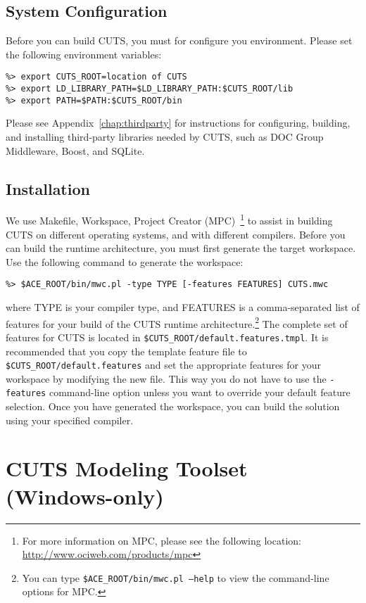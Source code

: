\subsection{System Configuration}

Before you can build CUTS, you must for configure you environment. Please
set the following environment variables:
\begin{lstlisting}
%> export CUTS_ROOT=location of CUTS
%> export LD_LIBRARY_PATH=$LD_LIBRARY_PATH:$CUTS_ROOT/lib
%> export PATH=$PATH:$CUTS_ROOT/bin
\end{lstlisting}
Please see Appendix~\ref{chap:thirdparty} for instructions for configuring,
building, and installing third-party libraries needed by CUTS, such as 
DOC Group Middleware, Boost, and SQLite.

\subsection{Installation}

We use Makefile, Workspace, Project Creator (MPC)~\footnote{For more information
on MPC, please see the following location: \url{http://www.ociweb.com/products/mpc}}
to assist in building CUTS
on different operating systems, and with different compilers. Before you can
build the runtime architecture, you must first generate the target workspace.
Use the following command to generate the workspace:
\begin{lstlisting}
%> $ACE_ROOT/bin/mwc.pl -type TYPE [-features FEATURES] CUTS.mwc
\end{lstlisting}
where TYPE is your compiler type, and FEATURES is a comma-separated list of 
features
for your build of the CUTS runtime architecture.\footnote{You can type 
\texttt{\$ACE\_ROOT/bin/mwc.pl --help} to view the command-line options for 
MPC.} The complete set of features for CUTS is located in 
\texttt{\$CUTS\_ROOT/default.features.tmpl}. It is recommended that you copy 
the template feature file to \texttt{\$CUTS\_ROOT/default.features}
and set the appropriate features for your workspace by 
modifying the new file. This way you do not have to use 
the \texttt{-features} command-line option unless you want
to override your default feature selection. Once you have generated 
the workspace, you can build the solution using your specified compiler.

\section{CUTS Modeling Toolset (Windows-only)}

